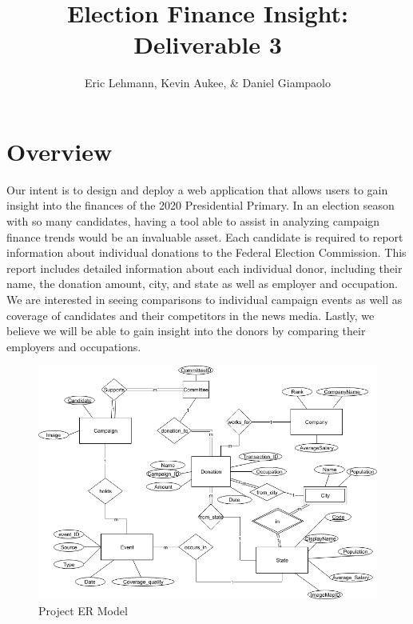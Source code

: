 \documentclass[12pt]{article}
\title{Election Finance Insight:\\Deliverable 3}
\author{Eric Lehmann, Kevin Aukee, \& Daniel Giampaolo}
\begin{document}
\maketitle
\section{Overview}
Our intent is to design and deploy a web application that allows users to gain insight into the finances of the 2020 Presidential Primary. In an election season with so many candidates, having a tool able to assist in analyzing campaign finance trends would be an invaluable asset. Each candidate is required to report information about individual donations to the Federal Election Commission. This report includes detailed information about each individual donor, including their name, the donation amount, city, and state as well as employer and occupation. We are interested in seeing comparisons to individual campaign events as well as coverage of candidates and their competitors in the news media. Lastly, we believe we will be able to gain insight into the donors by comparing their employers and occupations.
    \begin{figure}[H]
        \begin{center}
        \includegraphics[scale=.40]{projecter}
        \caption{Project ER Model}
        \label{fig:projecter}
        \end{center}
    \end{figure}
\end{document}
